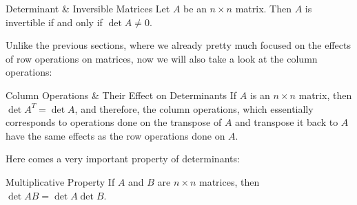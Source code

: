 \documentclass{article}
\begin{document}
\begin{theorem}{Determinant \& Inversible Matrices}
	Let $A$ be an $n \times n$ matrix. Then $A$ is invertible if and only if $\det A \neq 0$.
\end{theorem}

Unlike the previous sections, where we already pretty much focused on the effects of row operations on matrices, now we will also take a look at the column operations:

\begin{theorem}{Column Operations \& Their Effect on Determinants}
	If $A$ is an $n \times n$ matrix, then $\det A^T = \det A$, and therefore, the column operations, which essentially corresponds to operations done on the transpose of $A$ and transpose it back to $A$ have the same effects as the row operations done on $A$.
\end{theorem}
Here comes a very important property of determinants:
\begin{theorem}{Multiplicative Property}
	If $A$ and $B$ are $n \times n$ matrices, then $\det AB = \det A \det B$.
\end{theorem}
\end{document}
